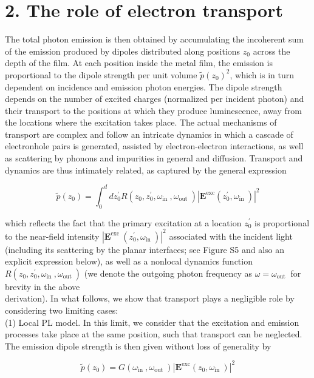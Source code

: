 \documentclass[10pt]{article}
\begin{document}
\section*{2. The role of electron transport}
The total photon emission is then obtained by accumulating the incoherent sum of the emission produced by dipoles distributed along positions $z_{0}$ across the depth of the film. At each position inside the metal film, the emission is proportional to the dipole strength per unit volume $\tilde{p}\left(z_{0}\right)^{2}$, which is in turn dependent on incidence and emission photon energies. The dipole strength depends on the number of excited charges (normalized per incident photon) and their transport to the positions at which they produce luminescence, away from the locations where the excitation takes place. The actual mechanisms of transport are complex and follow an intricate dynamics in which a cascade of electronhole pairs is generated, assisted by electron-electron interactions, as well as scattering by phonons and impurities in general and diffusion. Transport and dynamics are thus intimately related, as captured by the general expression

$$
\tilde{p}\left(z_{0}\right)=\int_{0}^{d} d z_{0}^{\prime} R\left(z_{0}, z_{0}^{\prime}, \omega_{\text {in }}, \omega_{\text {out }}\right)\left|\mathbf{E}^{\mathrm{exc}}\left(z_{0}^{\prime}, \omega_{\text {in }}\right)\right|^{2}
$$

which reflects the fact that the primary excitation at a location $z_{0}^{\prime}$ is proportional to the near-field intensity $\left|\mathbf{E}^{\text {exc }}\left(z_{0}^{\prime}, \omega_{\text {in }}\right)\right|^{2}$ associated with the incident light (including its scattering by the planar interfaces; see Figure S5 and also an explicit expression below), as well as a nonlocal dynamics function $R\left(z_{0}, z_{0}^{\prime}, \omega_{\text {in }}, \omega_{\text {out }}\right)$ (we denote the outgoing photon frequency as $\omega=\omega_{\text {out }}$ for brevity in the above\\
derivation). In what follows, we show that transport plays a negligible role by considering two limiting cases:\\
(1) Local PL model. In this limit, we consider that the excitation and emission processes take place at the same position, such that transport can be neglected. The emission dipole strength is then given without loss of generality by


\begin{equation*}
\tilde{p}\left(z_{0}\right)=G\left(\omega_{\text {in }}, \omega_{\text {out }}\right)\left|\mathbf{E}^{\mathrm{exc}}\left(z_{0}, \omega_{\text {in }}\right)\right|^{2} \tag{S3a}
\end{equation*}
\end{document}
